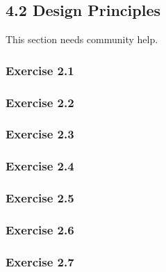\documentclass[../../main.tex]{subfiles}
\begin{document}
\subsection{4.2 Design Principles}

This section needs community help.

\subsubsection*{Exercise 2.1}

\subsubsection*{Exercise 2.2}

\subsubsection*{Exercise 2.3}

\subsubsection*{Exercise 2.4}

\subsubsection*{Exercise 2.5}

\subsubsection*{Exercise 2.6}

\subsubsection*{Exercise 2.7}
\end{document}

